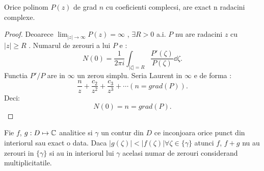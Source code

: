 \begin{aplicatie}
    Orice polinom $P(z)$ de grad $n$ cu coeficienti complecsi, are exact n radacini complexe.
    \begin{proof}
        Deoarece $\lim_{|z| \to \infty} P(z) = \infty$ , $\exists R > 0$ a.i. $P$ nu are radacini
        $z$ cu $|z| \geq R$ . Numarul de zerouri a lui $P$ e :
        \[
            N(0) = \frac{1}{2\pi i}\int_{|\zeta| = R} \frac{P'(\zeta)}{P(\zeta)} \dd \zeta .
        \]
        Functia $P'/P$ are in $\infty$ un zerou simplu. Seria Laurent in $\infty$ e de forma :
        \[
            \frac{n}{z} + \frac{c_2}{z^2} + \frac{c_3}{z^3} + \cdots (n = grad(P)) .
        \]
        Deci:
        \[
            N(0) = n = grad(P).
        \]
    \end{proof}
\end{aplicatie}

\begin{theorem}[Rouche]
    Fie $f$, $g : D \mapsto \mathbb{C}$ analitice si $\gamma$ un contur din $D$ ce inconjoara
    orice punct din interiorul sau exact o data.
    Daca $|g(\zeta)| < |f(\zeta)| \forall \zeta \in \{\gamma\}$ atunci
    $f$, $f+g$ nu au zerouri in $\{\gamma\}$ si au in interiorul lui $\gamma$ acelasi numar de zerouri
    considerand multiplicitatile.
\end{theorem}

